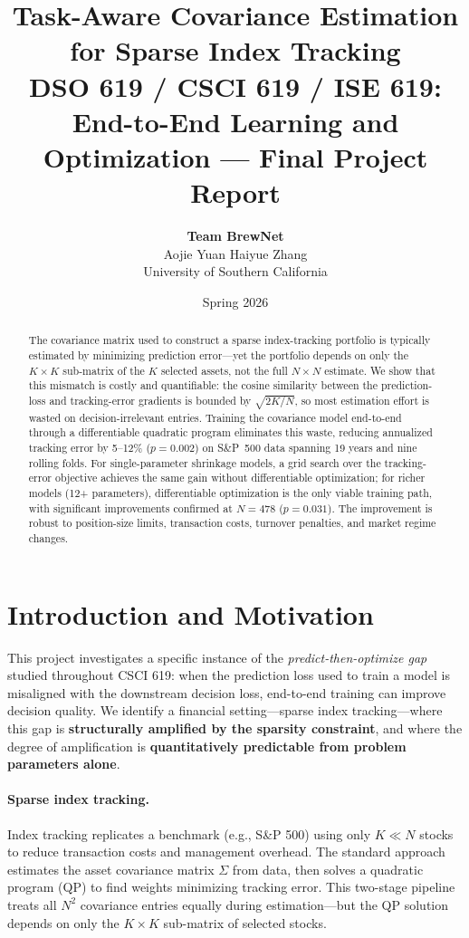 \documentclass[11pt]{article}
\title{\textbf{Task-Aware Covariance Estimation for Sparse Index Tracking} \\[6pt]
\large DSO 619 / CSCI 619 / ISE 619: End-to-End Learning and Optimization --- Final Project Report}
\author{
  \textbf{Team BrewNet} \\[4pt]
  Aojie Yuan \quad Haiyue Zhang \\[2pt]
  University of Southern California
}
\date{Spring 2026}
\begin{document}
\maketitle

\begin{abstract}
The covariance matrix used to construct a sparse index-tracking portfolio is typically estimated by minimizing prediction error---yet the portfolio depends on only the $K \times K$ sub-matrix of the $K$ selected assets, not the full $N \times N$ estimate. We show that this mismatch is costly and quantifiable: the cosine similarity between the prediction-loss and tracking-error gradients is bounded by $\sqrt{2K/N}$, so most estimation effort is wasted on decision-irrelevant entries. Training the covariance model end-to-end through a differentiable quadratic program eliminates this waste, reducing annualized tracking error by 5--12\% ($p = 0.002$) on S\&P~500 data spanning 19 years and nine rolling folds. For single-parameter shrinkage models, a grid search over the tracking-error objective achieves the same gain without differentiable optimization; for richer models (12+ parameters), differentiable optimization is the only viable training path, with significant improvements confirmed at $N{=}478$ ($p = 0.031$). The improvement is robust to position-size limits, transaction costs, turnover penalties, and market regime changes.
\end{abstract}

\section{Introduction and Motivation}
\label{sec:intro}

This project investigates a specific instance of the \emph{predict-then-optimize gap} studied throughout CSCI 619: when the prediction loss used to train a model is misaligned with the downstream decision loss, end-to-end training can improve decision quality. We identify a financial setting---sparse index tracking---where this gap is \textbf{structurally amplified by the sparsity constraint}, and where the degree of amplification is \textbf{quantitatively predictable from problem parameters alone}.

\paragraph{Sparse index tracking.}
Index tracking replicates a benchmark (e.g., S\&P 500) using only $K \ll N$ stocks to reduce transaction costs and management overhead. The standard approach estimates the asset covariance matrix $\Sigma$ from data, then solves a quadratic program (QP) to find weights minimizing tracking error. This two-stage pipeline treats all $N^2$ covariance entries equally during estimation---but the QP solution depends on only the $K \times K$ sub-matrix of selected stocks.
\end{document}
